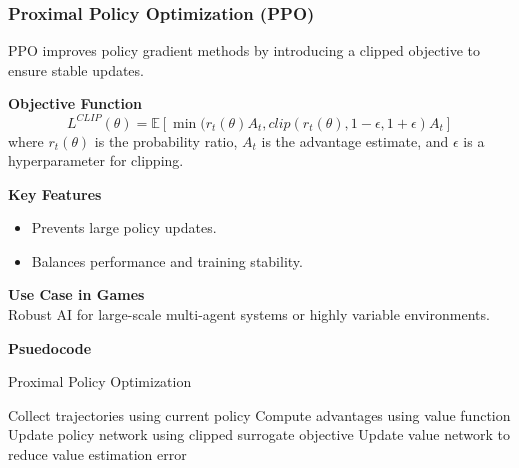 \documentclass[12pt,oneside,openright,a4paper]{cpe-english-project}
\begin{document}
\subsubsection{Proximal Policy Optimization (PPO)}
PPO improves policy gradient methods by introducing a clipped objective to ensure stable updates.\par
\textbf{Objective Function}
\begin{equation}
L^{CLIP}(\theta) = \mathbb{E}[\min(r_{t}(\theta)A_{t}, clip(r_{t}(\theta), 1 - \epsilon, 1 + \epsilon)A_{t}]
\end{equation}
where $r_{t}(\theta)$ is the probability ratio, $A_{t}$ is the advantage estimate, and $\epsilon$ is a hyperparameter for clipping.\par
\textbf{Key Features}
\begin{itemize}
\item Prevents large policy updates.
\item Balances performance and training stability.
\end{itemize}
\textbf{Use Case in Games} \\
Robust AI for large-scale multi-agent systems or highly variable environments.\par
\textbf{Psuedocode}
\begin{algorithm}
\caption{Proximal Policy Optimization}\label{alg:PPO}
\begin{algorithmic}
\State Collect trajectories using current policy
\State Compute advantages using value function
\State Update policy network using clipped surrogate objective
\State Update value network to reduce value estimation error
\EndFor
\end{algorithmic}
\end{algorithm}
\end{document}
